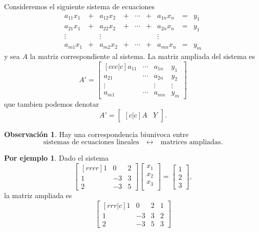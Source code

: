 \documentclass{article}
\theoremstyle{definition}
\theoremstyle{definition}
\newtheorem*{obs}{Observación}
\newtheorem*{ej}{Por ejemplo}
\theoremstyle{remark}
\begin{document}
\begin{defi}
  Consideremos el siguiente sistema de ecuaciones
  \[\begin{matrix}
  a_{11}x_{1} & + & a_{12}x_{2} & + & \cdots & + & a_{1n}x_n & = & y_1 \\ 
  a_{21}x_{1} & + & a_{22}x_{2} & + & \cdots & + & a_{2n}x_n & = & y_1 \\
  \vdots & & \vdots  & & & & \vdots & & \\
  a_{m1}x_{1} & + & a_{m2}x_2 & + & \cdots & + & a_{mn}x_{n} & = & y_{m}
\end{matrix}
\] y sea $A$ la matriz correspondiente al sistema. La matriz ampliada del sistema es \[
A'=\begin{bmatrix}[ccc|c]
  a_{11} & \cdots & a_{1n} & y_{1} \\
  a_{21} & \cdots & a_{2n} & y_{2} \\
  \vdots & & \vdots & \vdots \\
  a_{m1} & \cdots & a_{mn} & y_m
\end{bmatrix}
\] que tambien podemos denotar \[
A'=\begin{bmatrix}[c|c] A & Y \end{bmatrix}.
\]
\end{defi}
\begin{obs}
  Hay una correspondencia biunivoca entre \[
    \text{sistemas de ecuaciones lineales} \quad \longleftrightarrow \quad \text{matrices ampliadas.}
  \]
\end{obs}
\begin{ej}
  Dado el sistema \[
    \begin{bmatrix}[rrrr]
      1 & 0 & 2 \\
      1 & -3 & 3 \\
      2 & -3 & 5 
    \end{bmatrix}
    \begin{bmatrix}
x_1 \\
x_2 \\
x_3 \\
    \end{bmatrix}
=
\begin{bmatrix}
1 \\ 2 \\ 3
\end{bmatrix},
  \]
  la matriz ampliada es \[
    \begin{bmatrix}[rrr|c]
      1 & 0 & 2 & 1 \\ 1 & -3 & 3 & 2 \\ 2 & -3 & 5 & 3
    \end{bmatrix}
  \]
\end{ej}
\end{document}
